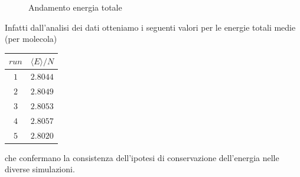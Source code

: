 \documentclass[a4paper,11pt]{article}
\begin{document}
\begin{figure}[H]
	\centering 
	\caption{Andamento energia totale}
\end{figure}
\noindent Infatti dall'analisi dei dati otteniamo i seguenti valori per le energie totali medie (per molecola)
\begin{table}[H]
	\centering
	\begin{tabular}{cl} 
		\hline
		$run$	&	$\langle E \rangle /N$ \\
		\hline
		$1$	&	$2.8044$\\
		$2$	&	$2.8049$\\
		$3$	&	$2.8053$\\
		$4$	&	$2.8057$\\
		$5$	&	$2.8020$\\\hline
	\end{tabular}
\end{table}
\medskip
\noindent che confermano la consistenza dell'ipotesi di conservazione dell'energia nelle diverse simulazioni.
\end{document}
